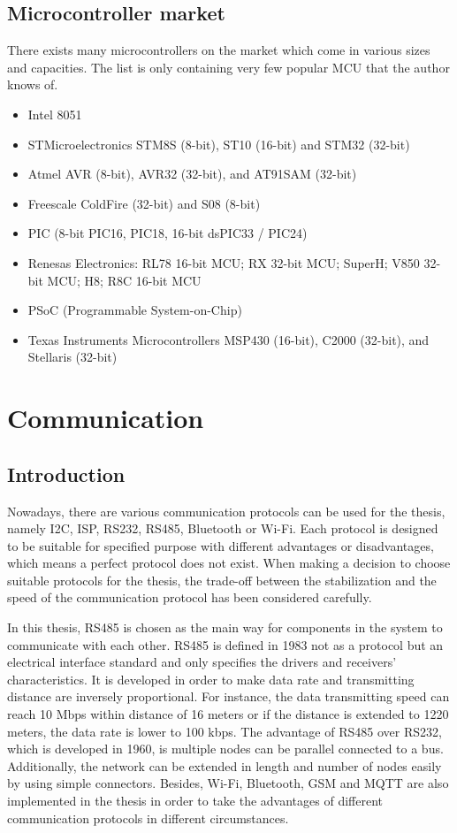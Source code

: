   \subsection{Microcontroller market}
  There exists many microcontrollers on the market which come in various sizes and capacities. The list is only containing very few popular MCU that the author knows of.
  \begin{itemize}
    \item Intel 8051
    \item STMicroelectronics STM8S (8-bit), ST10 (16-bit) and STM32 (32-bit)
    \item Atmel AVR (8-bit), AVR32 (32-bit), and AT91SAM (32-bit)
    \item Freescale ColdFire (32-bit) and S08 (8-bit)
    \item PIC (8-bit PIC16, PIC18, 16-bit dsPIC33 / PIC24)
    \item Renesas Electronics: RL78 16-bit MCU; RX 32-bit MCU; SuperH; V850 32-
    bit MCU; H8; R8C 16-bit MCU
    \item PSoC (Programmable System-on-Chip)
    \item Texas Instruments Microcontrollers MSP430 (16-bit), C2000 (32-bit), and
    Stellaris (32-bit)
  \end{itemize}

\section{Communication}
  \subsection{Introduction}
  Nowadays, there are various communication protocols can be used for the thesis, namely I2C, ISP, RS232, RS485, Bluetooth or Wi-Fi. Each protocol is designed to be suitable for specified purpose with different advantages or disadvantages, which means a perfect protocol does not exist. When making a decision to choose suitable protocols for the thesis, the trade-off between the stabilization and the speed of the communication protocol has been considered carefully.

  In this thesis, RS485 is chosen as the main way for components in the system to communicate with each other. RS485 is defined in 1983 not as a protocol but an electrical interface standard and only specifies the drivers and receivers’ characteristics. It is developed in order to make data rate and transmitting distance are inversely proportional. For instance, the data transmitting speed can reach 10 Mbps within distance of 16 meters or if the distance is extended to 1220 meters, the data rate is lower to 100 kbps. The advantage of RS485 over RS232, which is developed in 1960, is multiple nodes can be parallel connected to a bus. Additionally, the network can be extended in length and number of nodes easily by using simple connectors. Besides, Wi-Fi, Bluetooth, GSM and MQTT are also implemented in the thesis in order to take the advantages of different communication protocols in different circumstances. 
  

